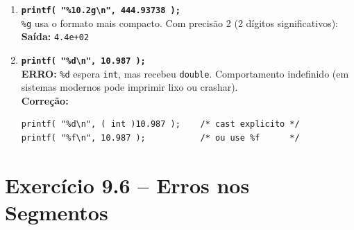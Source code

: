 \documentclass[12pt,a4paper]{article}
\begin{document}
\begin{respostabox}
\begin{enumerate}[label=\textbf{\alph*)}]
\item \textbf{\texttt{printf( "\%10.2g\textbackslash n", 444.93738 );}}\\
\texttt{\%g} usa o formato mais compacto. Com precisão 2 (2 dígitos significativos):\\
\textbf{Saída:} \texttt{\textvisiblespace\textvisiblespace\textvisiblespace\textvisiblespace\textvisiblespace 4.4e+02}

\item \textbf{\texttt{printf( "\%d\textbackslash n", 10.987 );}}\\
\textbf{ERRO:} \texttt{\%d} espera \texttt{int}, mas recebeu \texttt{double}.
Comportamento indefinido (em sistemas modernos pode imprimir lixo ou crashar).\\
\textbf{Correção:}
\begin{lstlisting}
printf( "%d\n", ( int )10.987 );    /* cast explicito */
printf( "%f\n", 10.987 );           /* ou use %f      */
\end{lstlisting}
\end{enumerate}
\end{respostabox}

\newpage

\section{Exercício 9.6 -- Erros nos Segmentos}
\end{document}
